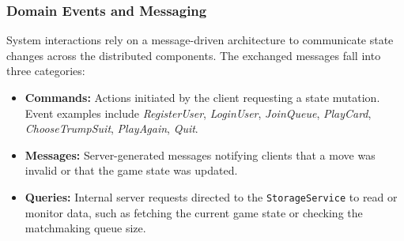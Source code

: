 \documentclass{scrartcl}
\begin{document}
\subsubsection*{Domain Events and Messaging}
System interactions rely on a message-driven architecture to communicate state changes across the distributed components. The exchanged messages fall into three categories:
\begin{itemize}
    \item \textbf{Commands:} Actions initiated by the client requesting a state mutation. Event examples include \textit{RegisterUser}, \textit{LoginUser}, \textit{JoinQueue}, \textit{PlayCard}, \textit{ChooseTrumpSuit}, \textit{PlayAgain}, \textit{Quit}.
    \item \textbf{Messages:} Server-generated messages notifying clients that a move was invalid or that the game state was updated.
    \item \textbf{Queries:} Internal server requests directed to the \texttt{StorageService} to read or monitor data, such as fetching the current game state or checking the matchmaking queue size.
\end{itemize}
\end{document}
